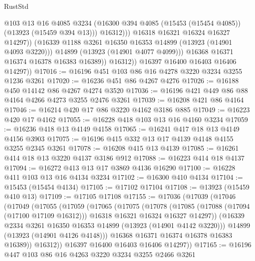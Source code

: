 \begin{lexlean}{RustStd}
\begin{coremodule}
{\begin{coremodule}
{{{{{{{{{{{{{{{{{{{{{{{{{{{{{{{{{{{{{                            @103
                            @13
                            @16
                            @4085
                            @3234
                            (@16300 @394 @4085 (@15453 (@15454 @4085)) (@13923 (@15459 @394 @13)))
                            @16312)))
                      @16318
                      @16321
                      @16324
                      @16327
                      @14297))
                  (@16339 @1188 @3261 @16350 @16353 @14899 (@13923 (@14901 @4093 @3220)))
                  @14899
                  (@13923 (@14901 @4077 @4099)))
                @16368
                @16371
                @16374
                @16378
                @16383
                @16389))
            @16312))
        @16397
        @16400
        @16403
        @16406
        @14297))
@17016 := @16196 @451 @103 @86 @16 @4278 @3220 @3234 @3255 @1236 @3261
@17020 := @16236 @451 @86 @4267 @4276
@17026 := @16188 @450 @14142 @86 @4267 @4274 @3520
@17036 := @16196 @421 @449 @86 @88 @4164 @4266 @4273 @3255 @2476 @3261
@17039 := @16208 @421 @86 @4164
@17046 := @16214 @420 @17 @86 @3220 @4162 @3186 @885
@17049 := @16223 @420 @17 @4162
@17055 := @16228 @418 @103 @13 @16 @4160 @3234
@17059 := @16236 @418 @13 @4149 @4158
@17065 := @16241 @417 @18 @13 @4149 @4156 @3903
@17075 := @16196 @415 @332 @13 @17 @4139 @4148 @4155 @3255 @2345 @3261
@17078 := @16208 @415 @13 @4139
@17085 := @16261 @414 @18 @13 @3220 @4137 @3186 @912
@17088 := @16223 @414 @18 @4137
@17094 := @16272 @413 @13 @17 @3869 @4136 @16290
@17100 := @16228 @411 @103 @13 @16 @4134 @3234
@17102 := @16300 @410 @4134
@17104 := @15453 (@15454 @4134)
@17105 := @17102 @17104
@17108 := @13923 (@15459 @410 @13)
@17109 := @17105 @17108
@17155 := @17036
    (@17039
      (@17046
        (@17049
          (@17055
            (@17059
              (@17065
                (@17075
                  (@17078
                    (@17085
                      (@17088 (@17094 (@17100 @17109 @16312)))
                      @16318
                      @16321
                      @16324
                      @16327
                      @14297))
                  (@16339 @2334 @3261 @16350 @16353 @14899 (@13923 (@14901 @4142 @3220)))
                  @14899
                  (@13923 (@14901 @4126 @4148)))
                @16368
                @16371
                @16374
                @16378
                @16383
                @16389))
            @16312))
        @16397
        @16400
        @16403
        @16406
        @14297))
@17165 := @16196 @447 @103 @86 @16 @4263 @3220 @3234 @3255 @2466 @3261
}}}}}}}}}}}}}}}}}}}}}}}}}}}}}}}}}}}}}
\end{coremodule}}
\end{coremodule}
\end{lexlean}
